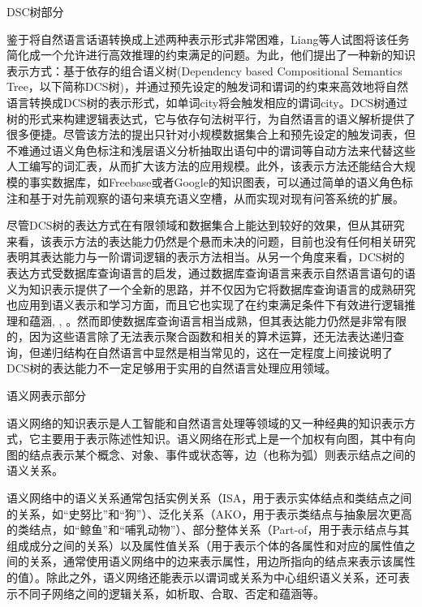 DSC树部分


鉴于将自然语言话语转换成上述两种表示形式非常困难，Liang等人\cite{Liang2013}试图将该任务简化成一个允许进行高效推理的约束满足的问题。为此，他们提出了一种新的知识表示方式：基于依存的组合语义树(Dependency based  Compositional Semantics Tree，以下简称DCS树)，并通过预先设定的触发词和谓词的约束来高效地将自然语言转换成DCS树的表示形式，如单词city将会触发相应的谓词city。DCS树通过树的形式来构建逻辑表达式，它与依存句法树平行，为自然语言的语义解析提供了很多便捷。尽管该方法的提出只针对小规模数据集合上和预先设定的触发词表，但不难通过语义角色标注和浅层语义分析抽取出语句中的谓词等自动方法来代替这些人工编写的词汇表，从而扩大该方法的应用规模。此外，该表示方法还能结合大规模的事实数据库，如Freebase\cite{Bollacker2008}或者Google的知识图表，可以通过简单的语义角色标注和基于对先前观察的语句来填充语义空槽，从而实现对现有问答系统的扩展。


尽管DCS树的表达方式在有限领域和数据集合上能达到较好的效果，但从其研究\cite{Liang2011}来看，该表示方法的表达能力仍然是个悬而未决的问题，目前也没有任何相关研究表明其表达能力与一阶谓词逻辑的表示方法相当。从另一个角度来看，DCS树的表达方式受数据库查询语言的启发\cite{Yarin2013}，通过数据库查询语言来表示自然语言语句的语义为知识表示提供了一个全新的思路，并不仅因为它将数据库查询语言的成熟研究也应用到语义表示和学习方面，而且它也实现了在约束满足条件下有效进行逻辑推理和蕴涵\cite{Giordani2010a}, \cite{Giordani2010b}, \cite{Giordani2009}。然而即使数据库查询语言相当成熟，但其表达能力仍然是非常有限的，因为这些语言除了无法表示聚合函数和相关的算术运算，还无法表达递归查询\cite{Libkin2003}，但递归结构在自然语言中显然是相当常见的，这在一定程度上间接说明了DCS树的表达能力不一定足够用于实用的自然语言处理应用领域。



语义网表示部分

语义网络的知识表示是人工智能和自然语言处理等领域的又一种经典的知识表示方式，它主要用于表示陈述性知识。语义网络在形式上是一个加权有向图，其中有向图的结点表示某个概念、对象、事件或状态等，边（也称为弧）则表示结点之间的语义关系。

语义网络中的语义关系通常包括实例关系（ISA，用于表示实体结点和类结点之间的关系，如“史努比”和“狗”）、泛化关系（AKO，用于表示类结点与抽象层次更高的类结点，如“鲸鱼”和“哺乳动物”）、部分整体关系（Part-of，用于表示结点与其组成成分之间的关系）以及属性值关系（用于表示个体的各属性和对应的属性值之间的关系，通常使用语义网络中的边来表示属性，用边所指向的结点来表示该属性的值）。除此之外，语义网络还能表示以谓词或关系为中心组织语义关系，还可表示不同子网络之间的逻辑关系，如析取、合取、否定和蕴涵等。

